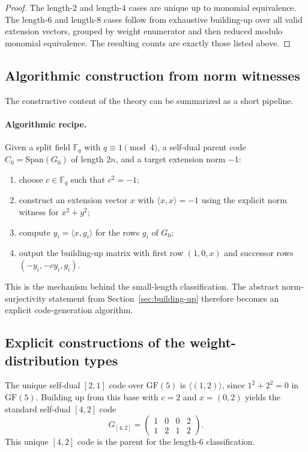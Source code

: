 \documentclass[12pt]{article}
\newcommand{\F}{\mathbb{F}}
\newcommand{\GF}[1]{\ensuremath{\mathrm{GF}(#1)}}
\newcommand{\Span}{\mathrm{Span}}
\begin{document}
\begin{proof}
The length-$2$ and length-$4$ cases are unique up to monomial equivalence. The length-$6$ and length-$8$ cases follow from exhaustive building-up over all valid extension vectors, grouped by weight enumerator and then reduced modulo monomial equivalence. The resulting counts are exactly those listed above.
\end{proof}

\subsection{Algorithmic construction from norm witnesses}

The constructive content of the theory can be summarized as a short pipeline.

\paragraph{Algorithmic recipe.}
Given a split field $\F_q$ with $q \equiv 1 \pmod 4$, a self-dual parent code $C_0 = \Span(G_0)$ of length $2n$, and a target extension norm $-1$:
\begin{enumerate}
\item choose $c \in \F_q$ such that $c^2 = -1$;
\item construct an extension vector $x$ with $\langle x,x\rangle = -1$ using the explicit norm witness for $x^2 + y^2$;
\item compute $y_i = \langle x,g_i\rangle$ for the rows $g_i$ of $G_0$;
\item output the building-up matrix with first row $(1,0,x)$ and successor rows $(-y_i,-cy_i,g_i)$.
\end{enumerate}

This is the mechanism behind the small-length classification. The abstract norm-surjectivity statement from Section~\ref{sec:building-up} therefore becomes an explicit code-generation algorithm.

\subsection{Explicit constructions of the weight-distribution types}

The unique self-dual $[2,1]$ code over $\GF{5}$ is $\langle (1,2)\rangle$, since $1^2 + 2^2 = 0$ in $\GF{5}$. Building up from this base with $c=2$ and $x=(0,2)$ yields the standard self-dual $[4,2]$ code
\[
G_{[4,2]}=
\begin{pmatrix}
1 & 0 & 0 & 2\\
1 & 2 & 1 & 2
\end{pmatrix}.
\]
This unique $[4,2]$ code is the parent for the length-$6$ classification.
\end{document}
